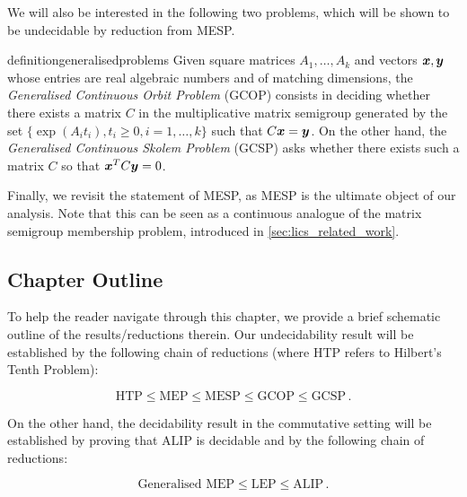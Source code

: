 We will also be interested in the following two problems, which will be shown to be undecidable by reduction from MESP\@.

\begin{restatable}{definition}{generalisedproblems}
\label{def:generalised-problems}
Given square matrices $A_{1}, \ldots, A_{k}$ and vectors $\boldsymbol{x}, \boldsymbol{y}$ whose entries are real algebraic numbers and of matching dimensions, the \emph{Generalised Continuous Orbit Problem} (GCOP) consists in deciding whether there exists a matrix $C$ in the multiplicative matrix semigroup generated by the set $\lbrace \exp(A_{i} t_{i}), t_{i} \geq 0, i = 1, \ldots, k \rbrace$ such that $C\boldsymbol{x} = \boldsymbol{y}$. On the other hand, the \emph{Generalised Continuous Skolem Problem} (GCSP) asks whether there exists such a matrix $C$ so that $\boldsymbol{x}^{T} C \boldsymbol{y} = 0$.
\end{restatable}

Finally, we revisit the statement of MESP, as MESP is the ultimate object of our analysis.
Note that this can be seen as a continuous analogue of the matrix semigroup membership problem, introduced in \cref{sec:lics_related_work}.

\MESP*

\subsection{Chapter Outline}
\label{sec:lics_outline}

To help the reader navigate through this chapter, we provide a brief schematic outline of the results/reductions therein. Our undecidability result will be established by the following chain of reductions (where HTP refers to Hilbert's Tenth Problem):

\begin{equation*}
\mbox{HTP} \leq \mbox{MEP} \leq \mbox{MESP} \leq \mbox{GCOP} \leq \mbox{GCSP} \, .
\end{equation*}

On the other hand, the decidability result in the commutative setting will be established by proving that $\mbox{ALIP}$ is decidable and by the following chain of reductions:

\begin{equation*}
\mbox{Generalised MEP} \leq \mbox{LEP} \leq \mbox{ALIP} \, .
\end{equation*}

